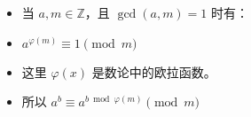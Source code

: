 \documentclass[E:/GsjzTle/main/main.tex]{subfiles}
\begin{document}
\begin{itemize}
\item
  当 \(a,m\in \mathbb{Z}\)，且 \(\gcd(a,m)=1\) 时有：
\item
  \(a^{\varphi(m)}\equiv 1\pmod{m}\)
\item
  这里 \(\varphi(x)\) 是数论中的欧拉函数。
\item
  所以 \(a^b\equiv a^{b\bmod \varphi(m)}\pmod m\)
\end{itemize}
\end{document}
